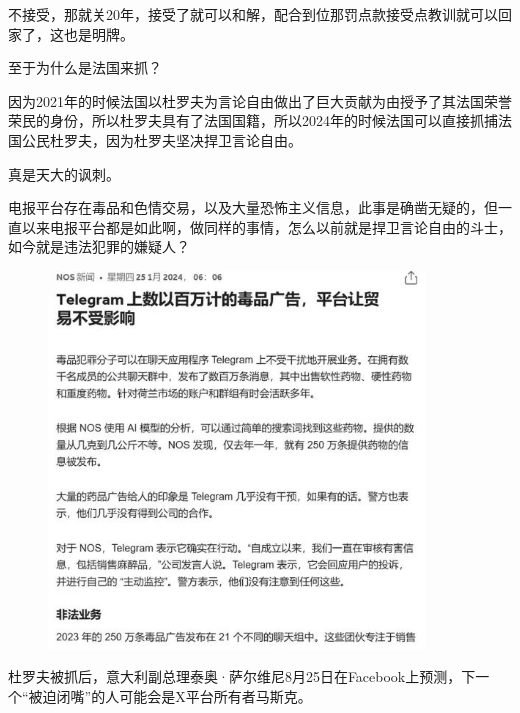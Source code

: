 \documentclass[UTF8,11pt,oneside]{ctexart}
\begin{document}
不接受，那就关20年，接受了就可以和解，配合到位那罚点款接受点教训就可以回家了，这也是明牌。

至于为什么是法国来抓？

因为2021年的时候法国以杜罗夫为言论自由做出了巨大贡献为由授予了其法国荣誉荣民的身份，所以杜罗夫具有了法国国籍，所以2024年的时候法国可以直接抓捕法国公民杜罗夫，因为杜罗夫坚决捍卫言论自由。

真是天大的讽刺。

电报平台存在毒品和色情交易，以及大量恐怖主义信息，此事是确凿无疑的，但一直以来电报平台都是如此啊，做同样的事情，怎么以前就是捍卫言论自由的斗士，如今就是违法犯罪的嫌疑人？

\begin{figure}[H]
    \centering
    \includegraphics[width=10cm]{2024-08-28-002.jpg}
\end{figure}

杜罗夫被抓后，意大利副总理泰奥·萨尔维尼8月25日在Facebook上预测，下一个“被迫闭嘴”的人可能会是X平台所有者马斯克。
\end{document}
